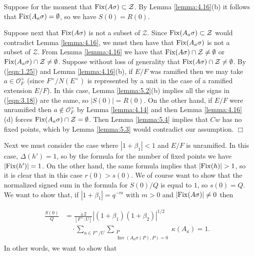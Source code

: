 \documentclass[12pt,letterpaper]{amsart}
\numberwithin{equation}{section}
\theoremstyle{definition}
\theoremstyle{plain}
\providecommand{\cal}{\mathcal}
\def\zz{{\cal Z}}
\def\qed{$\Box$}
\def\off{{\cal O}_F}
\begin{document}
Suppose for the moment that ${\rm Fix}(A\sigma ) \subset \zz$.
By Lemma \ref{lemma:4.16}(b) 
it follows that ${\rm Fix}(A_a\sigma ) =\emptyset $,
so we have $S(0) = R(0)$.
 
Suppose next that ${\rm Fix}(A\sigma )$ is not a subset of $\zz$. Since
${\rm Fix}(A_a\sigma ) \subset \zz$ 
would contradict Lemma \ref{lemma:4.16},
we must then have that ${\rm Fix}(A_a\sigma )$ is not a subset
of $\zz$. 
From Lemma \ref{lemma:4.16} 
we have that ${\rm Fix}(A\sigma ) \cap \zz \not= \emptyset$
or ${\rm Fix}(A_a\sigma ) \cap \zz \not= \emptyset$. Suppose without loss of 
generality that 
${\rm Fix}(A\sigma ) \cap \zz \not= \emptyset$. 
By (\ref{eqn:1.25}) and 
Lemma \ref{lemma:4.16}(b), if $E/F$ was 
ramified then we may take $a\in \off^{\times}$
(since $F^{\times}/N(E^{\times})$ is represented by a unit in the
case of a ramified extension $E/F$).
In this case, Lemma \ref{lemma:5.2}(b) implies all the signs in 
(\ref{eqn:3.18}) are
the same, so $|S(0)|=R(0)$. On the other hand, if $E/F$ were
unramified then $a\notin \off^{\times}$ by 
Lemma \ref{lemma:4.14} and then
Lemma \ref{lemma:4.16}(d) forces ${\rm Fix}(A_a\sigma ) \cap \zz = \emptyset$.
Then Lemma \ref{lemma:5.4} implies that $Cw$ has no fixed points, which
by Lemma \ref{lemma:5.3} would contradict our assumption.
\qed

Next we must consider the case where $|1+\beta_1|<1$ and $E/F$ is unramified.
In this case, $\Delta (h') = 1$, so by the formula for the number of fixed
points we have $|{\rm Fix}(h')| = 1$. On the other hand, the same formula
implies that $|{\rm Fix}(h)| > 1$, so it is clear that in this case
$r(0) > s(0)$. We of course want to show that the normalized signed sum in the
formula for $S(0)/Q$ is equal to $1$, so $s(0)=Q$. We want to show that,
if $|1+\beta_1| = q^{-m}$ with $m>0$ and $|{\rm Fix}(A\sigma )|\not= 0$
then

\begin{equation}
\begin{aligned}
\frac{S(0)}{Q}
&=\frac{\pm2}{[F^\times:U]}|(1+\beta_1)(1+\beta_2)|^{1/2}
\\[-2pt]
&\quad\cdot
\sum_{a\in F^\times/U}
\sum_{\substack{P\\\operatorname{Inv}(A_a\sigma(P),P)=0}}
\kappa(A_a)=1.
\end{aligned}
\label{eqn:5.10}
\end{equation}
In other words, we want to show that
\end{document}
